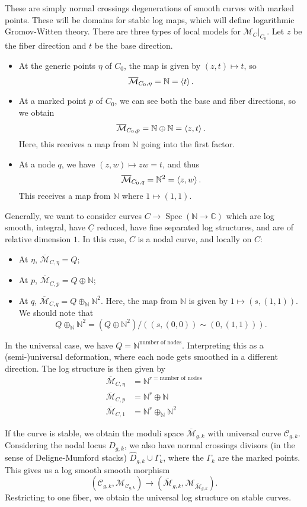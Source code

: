 \documentclass[leqno, openany]{memoir}
\theoremstyle{definition}
\theoremstyle{remark}
\theoremstyle{plain}
\theoremstyle{definition}
\theoremstyle{remark}
\newcommand{\N}{\mathbb{N}}
\newcommand{\C}{\mathbb{C}}
\newcommand{\mc}[1]{\mathcal{#1}}
\newcommand{\ol}[1]{\overline{#1}}
\newcommand{\ul}[1]{\underline{#1}}
\newcommand{\wh}[1]{\widehat{#1}}
\DeclareMathOperator{\Spec}{Spec}
\begin{document}
These are simply normal crossings degenerations of smooth curves with marked points. These will be domains for stable log maps, which will define logarithmic Gromov-Witten theory. There are three types of local models for $\mc{M}_C |_{C_0}$. Let $z$ be the fiber direction and $t$ be the base direction.
\begin{itemize}
\item At the generic points $\eta$ of $C_0$, the map is given by $(z,t) \mapsto t$, so
  \[ \ol{\mc{M}}_{C_0, \eta} = \N = \ev{t}. \]
\item At a marked point $p$ of $C_0$, we can see both the base and fiber directions, so we obtain
  \[ \ol{\mc{M}}_{C_0, p} = \N \oplus \N = \ev{z,t}. \]
  Here, this receives a map from $\N$ going into the first factor.
\item At a node $q$, we have $(z,w) \mapsto zw = t$, and thus
  \[ \ol{\mc{M}}_{C_0, q} = \N^2 = \ev{z,w}. \]
  This receives a map from $\N$ where $1 \mapsto (1,1)$.
\end{itemize}

Generally, we want to consider curves $C \to \Spec(\N \to \C)$ which are log smooth, integral, have $\ul{C}$ reduced, have fine separated log structures, and are of relative dimension $1$. In this case, $C$ is a nodal curve, and locally on $C$:
\begin{itemize}
\item At $\eta$, $\ol{\mc{M}}_{C, \eta} = Q$;
\item At $p$, $\ol{\mc{M}}_{C, p} = Q \oplus \N$;
\item At $q$, $\ol{\mc{M}}_{C, q} = Q \oplus_{\N} \N^2$. Here, the map from $\N$ is given by $1 \mapsto (s, (1,1))$. We should note that
  \[ Q \oplus_{\N} \N^2 = (Q \oplus \N^2) / ((s, (0,0)) \sim (0, (1,1))). \]
\end{itemize}

In the universal case, we have $Q = \N^{\text{number of nodes}}$. Interpreting this as a (semi-)universal deformation, where each node gets smoothed in a different direction. The log structure is then given by
\begin{align*}
\ol{\mc{M}}_{C, \eta} &= \N^{r = \text{number of nodes}} \\
\ol{\mc{M}}_{C, p} &= \N^{r} \oplus \N \\
\ol{\mc{M}}_{C, 1} &= \N^{r} \oplus_{\N} \N^2 
\end{align*}

If the curve is stable, we obtain the moduli space $\ol{\mc{M}}_{g,k}$ with universal curve $\mc{C}_{g,k}$. Considering the nodal locus $D_{g,k}$, we also have normal crossings divisors (in the sense of Deligne-Mumford stacks) $\wh{D}_{g,k} \cup \Gamma_k$, where the $\Gamma_k$ are the marked points. This gives us a log smooth smooth morphism
\[ (\mc{C}_{g,k}, \mc{M}_{\mc{C}_{g,k}}) \to (\ol{\mc{M}}_{g,k}, \mc{M}_{\ol{\mc{M}}_{g,k}}). \]
Restricting to one fiber, we obtain the universal log structure on stable curves.
\end{document}
